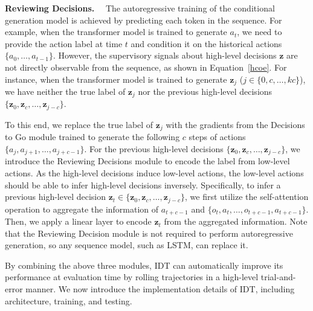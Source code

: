 \noindent\textbf{Reviewing Decisions.}~~
The autoregressive training of the conditional generation model is achieved by predicting each token in the sequence. 
For example, when the transformer model is trained to generate $a_t$, we need to provide the action label at time $t$ and condition it on the historical actions $\{a_0,\dots,a_{t-1}\}$. However, the supervisory signals about high-level decisions $\textbf{z}$ are not directly observable from the sequence, as shown in Equation~\eqref{hcoe}. For instance, when the transformer model is trained to generate $\textbf{z}_{j}$ ($j\in\{0,c,\dots,kc\}$), we have neither the true label of $\textbf{z}_{j}$ nor the previous high-level decisions $\{\textbf{z}_0,\textbf{z}_c,\dots,\textbf{z}_{j-c}\}$. 

To this end, we replace the true label of $\textbf{z}_{j}$ with the gradients from the Decisions to Go module trained to generate the following $c$ steps of actions $\{a_{j},a_{j+1},\dots,a_{j+c-1}\}$. For the previous high-level decisions $\{\textbf{z}_0,\textbf{z}_c,\dots,\textbf{z}_{j-c}\}$, we introduce the Reviewing Decisions module to encode the label from low-level actions. 
As the high-level decisions induce low-level actions, the low-level actions should be able to infer high-level decisions inversely. Specifically, to infer a previous high-level decision $\textbf{z}_t \in \{\textbf{z}_0,\textbf{z}_c,\dots,\textbf{z}_{j-c}\}$, we first utilize the self-attention operation to aggregate the information of $a_{t+c-1}$ and $\{o_t,a_t,\dots,o_{t+c-1},a_{t+c-1}\}$. Then, we apply a linear layer to encode $\textbf{z}_t$ from the aggregated information. Note that the Reviewing Decision module is not required to perform autoregressive generation, so any sequence model, such as LSTM, can replace it.

By combining the above three modules, IDT can automatically improve its performance at evaluation time by rolling trajectories in a high-level trial-and-error manner. We now introduce the implementation details of IDT, including architecture, training, and testing.

